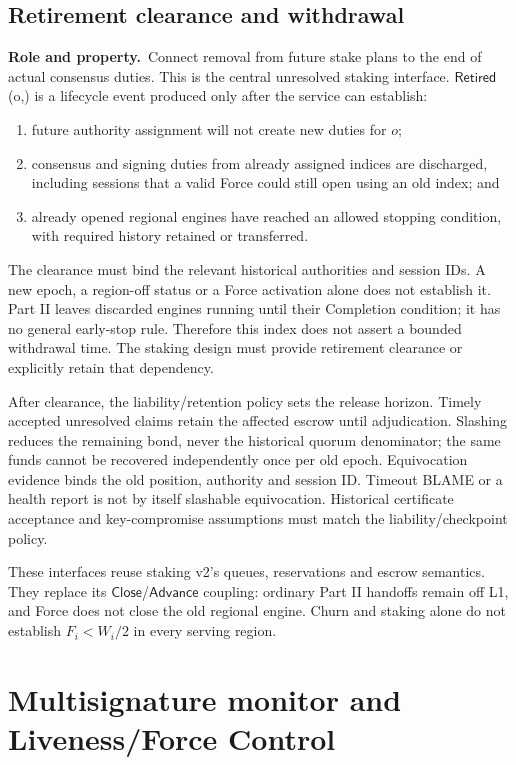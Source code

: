 \documentclass[11pt,a4paper]{article}
\newcommand{\api}[1]{\ensuremath{\mathsf{#1}}}
\newcommand{\role}{\textbf{Role and property.}\ }
\begin{document}
\subsection{Retirement clearance and withdrawal}\label{sec:retirement}
\role Connect removal from future stake plans to the end of actual
consensus duties. This is the central unresolved staking interface.
\api{Retired}(o,) is a lifecycle event produced only after
the service can establish:
\begin{enumerate}
\item future authority assignment will not create new duties for $o$;
\item consensus and signing duties from already assigned indices are
discharged, including
sessions that a valid Force could still open using an old index; and
\item already opened regional engines have reached an allowed stopping
condition, with required history retained or transferred.
\end{enumerate}
The clearance must bind the relevant historical authorities and session
IDs. A new epoch, a region-off status or a Force activation alone does
not establish it. Part II leaves discarded engines running until their
Completion condition; it has no general early-stop rule. Therefore this
index does not assert a bounded withdrawal time. The staking design must
provide retirement clearance or explicitly retain that dependency.

After clearance, the liability/retention policy sets the release horizon.
Timely accepted unresolved claims retain the affected escrow until
adjudication. Slashing reduces the remaining bond, never the historical
quorum denominator; the same funds cannot be recovered independently
once per old epoch. Equivocation evidence binds the old position,
authority and session ID. Timeout BLAME or a health report is not by
itself slashable equivocation. Historical certificate acceptance and
key-compromise assumptions must match the liability/checkpoint policy.

These interfaces reuse staking v2's queues, reservations and escrow
semantics. They replace its \api{Close}/\api{Advance} coupling: ordinary
Part II handoffs remain off L1, and Force does not close the old regional
engine. Churn and staking alone do not establish $F_i<W_i/2$ in every
serving region.

\section{Multisignature monitor and Liveness/Force Control}\label{sec:force}
\end{document}
